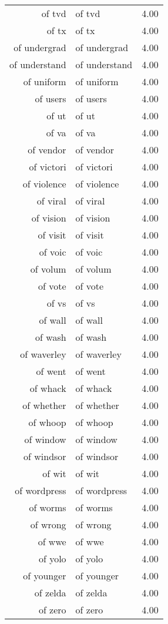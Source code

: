 \begin{table}[ht]
\begin{tabular}{rlr}
  of tvd & of tvd & 4.00 \\ 
  of tx & of tx & 4.00 \\ 
  of undergrad & of undergrad & 4.00 \\ 
  of understand & of understand & 4.00 \\ 
  of uniform & of uniform & 4.00 \\ 
  of users & of users & 4.00 \\ 
  of ut & of ut & 4.00 \\ 
  of va & of va & 4.00 \\ 
  of vendor & of vendor & 4.00 \\ 
  of victori & of victori & 4.00 \\ 
  of violence & of violence & 4.00 \\ 
  of viral & of viral & 4.00 \\ 
  of vision & of vision & 4.00 \\ 
  of visit & of visit & 4.00 \\ 
  of voic & of voic & 4.00 \\ 
  of volum & of volum & 4.00 \\ 
  of vote & of vote & 4.00 \\ 
  of vs & of vs & 4.00 \\ 
  of wall & of wall & 4.00 \\ 
  of wash & of wash & 4.00 \\ 
  of waverley & of waverley & 4.00 \\ 
  of went & of went & 4.00 \\ 
  of whack & of whack & 4.00 \\ 
  of whether & of whether & 4.00 \\ 
  of whoop & of whoop & 4.00 \\ 
  of window & of window & 4.00 \\ 
  of windsor & of windsor & 4.00 \\ 
  of wit & of wit & 4.00 \\ 
  of wordpress & of wordpress & 4.00 \\ 
  of worms & of worms & 4.00 \\ 
  of wrong & of wrong & 4.00 \\ 
  of wwe & of wwe & 4.00 \\ 
  of yolo & of yolo & 4.00 \\ 
  of younger & of younger & 4.00 \\ 
  of zelda & of zelda & 4.00 \\ 
  of zero & of zero & 4.00 \\ 

\end{tabular}
\end{table}
